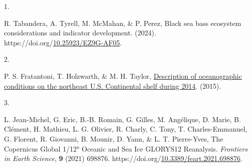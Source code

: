 \documentclass[
  10pt,
  letterpaper,
  DIV=11,
  numbers=noendperiod]{scrartcl}
\newlength{\cslhangindent}
\newlength{\csllabelwidth}
\newenvironment{CSLReferences}[2] %
 {\begin{list}{}{%
  \setlength{\itemindent}{0pt}
  \setlength{\leftmargin}{0pt}
  \setlength{\parsep}{0pt}
  \ifodd #1
   \setlength{\leftmargin}{\cslhangindent}
   \setlength{\itemindent}{-1\cslhangindent}
  \fi
  \setlength{\itemsep}{#2\baselineskip}}}
 {\end{list}}
\newcommand{\CSLLeftMargin}[1]{\parbox[t]{\csllabelwidth}{\strut#1\strut}}
\newcommand{\CSLRightInline}[1]{\parbox[t]{\linewidth - \csllabelwidth}{\strut#1\strut}}
\begin{document}
\label{refs}
\begin{CSLReferences}{0}{0}
\CSLLeftMargin{1. }%
\CSLRightInline{R. Tabandera, A. Tyrell, M. McMahan, \& P. Perez, Black
sea bass ecosystem considerations and indicator development. (2024).
https://doi.org/\href{https://doi.org/10.25923/EZ9G-AF05}{10.25923/EZ9G-AF05}.}

\CSLLeftMargin{2. }%
\CSLRightInline{P. S. Fratantoni, T. Holzwarth, \& M. H. Taylor,
\href{https://repository.library.noaa.gov/view/noaa/5047}{Description of
oceanographic conditions on the northeast {U}.{S}. Continental shelf
during 2014}. (2015).}

\CSLLeftMargin{3. }%
\CSLRightInline{L. Jean-Michel, G. Eric, B.-B. Romain, G. Gilles, M.
Angélique, D. Marie, B. Clément, H. Mathieu, L. G. Olivier, R. Charly,
C. Tony, T. Charles-Emmanuel, G. Florent, R. Giovanni, B. Mounir, D.
Yann, \& L. T. Pierre-Yves, The {Copernicus} {Global} 1/12° {Oceanic}
and {Sea} {Ice} {GLORYS12} {Reanalysis}. \emph{Frontiers in Earth
Science}, \textbf{9} (2021) 698876.
https://doi.org/\href{https://doi.org/10.3389/feart.2021.698876}{10.3389/feart.2021.698876}.}

\end{CSLReferences}
\end{document}
